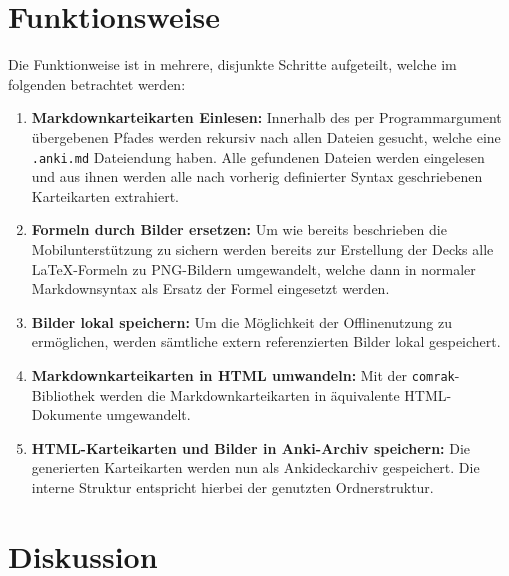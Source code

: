 \documentclass[ngerman]{article}
\begin{document}
\section{Funktionsweise}
Die Funktionweise ist in mehrere, disjunkte Schritte aufgeteilt, welche im folgenden betrachtet werden:
\begin{enumerate}
  \item \textbf{Markdownkarteikarten Einlesen:} Innerhalb des per Programmargument übergebenen Pfades werden rekursiv nach allen Dateien gesucht, welche eine \texttt{.anki.md} Dateiendung haben. Alle gefundenen Dateien werden eingelesen und aus ihnen werden alle nach vorherig definierter Syntax geschriebenen Karteikarten extrahiert.
  \item \textbf{Formeln durch Bilder ersetzen:} Um wie bereits beschrieben die Mobilunterstützung zu sichern werden bereits zur Erstellung der Decks alle \LaTeX-Formeln zu PNG-Bildern umgewandelt, welche dann in normaler Markdownsyntax als Ersatz der Formel eingesetzt werden.
  \item \textbf{Bilder lokal speichern:} Um die Möglichkeit der Offlinenutzung zu ermöglichen, werden sämtliche extern referenzierten Bilder lokal gespeichert.
  \item \textbf{Markdownkarteikarten in HTML umwandeln:} Mit der \texttt{comrak}-Bibliothek \cite{comrak} werden die Markdownkarteikarten in äquivalente HTML-Dokumente umgewandelt.
  \item \textbf{HTML-Karteikarten und Bilder in Anki-Archiv speichern:} Die generierten Karteikarten werden nun als Ankideckarchiv gespeichert. Die interne Struktur entspricht hierbei der genutzten Ordnerstruktur.
\end{enumerate}
\section{Diskussion}
\end{document}
